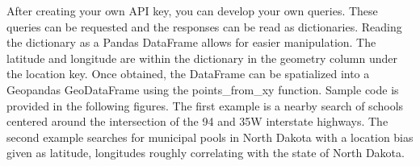 \documentclass[article,12pt]{article}
\numberwithin{equation}{section}
\begin{document}
After creating your own API key, you can develop your own queries. These queries can be requested and the responses can be read as dictionaries. Reading the dictionary as a Pandas DataFrame allows for easier manipulation. The latitude and longitude are within the dictionary in the geometry column under the location key. Once obtained, the DataFrame can be spatialized into a Geopandas GeoDataFrame using the points\_from\_xy function. Sample code is provided in the following figures. The first example is a nearby search of schools centered around the intersection of the 94 and 35W interstate highways. The second example searches for municipal pools in North Dakota with a location bias given as latitude, longitudes roughly correlating with the state of North Dakota.

\begin{adjustwidth}{-.7in}{-.7in}
	\\
	\\
\end{adjustwidth}
\end{document}

